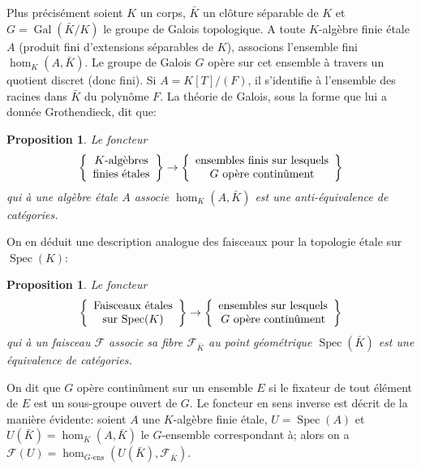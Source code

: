 \documentclass{book}
\DeclareMathOperator{\gal}{Gal}
\DeclareMathOperator{\spec}{Spec}
\newcommand{\cF}{\mathcal{F}}
\newtheorem{proposition}[subsubsection]{Proposition}
\begin{document}
Plus précisément soient $K$ un corps, $\bar K$ un clôture séparable de $K$ et 
$G = \gal(\bar K/K)$ le groupe de Galois topologique. A toute $K$-algèbre finie 
étale $A$ (produit fini d'extensions séparables de $K$), associons l'ensemble 
fini $\hom_K(A,\bar K)$. Le groupe de Galois $G$ opère sur cet ensemble à 
travers un quotient discret (donc fini). Si $A=K[T]/(F)$, il s'identifie à 
l'ensemble des racines dans $\bar K$ du polynôme $F$. La théorie de Galois, 
sous la forme que lui a donnée Grothendieck, dit que:





\begin{proposition}\label{I:2-4-3}
Le foncteur 
\[
  \left\{\begin{array}{c}
          \textnormal{$K$-algèbres} \\ 
          \textnormal{finies étales}
        \end{array}\right\}
  \to 
  \left\{\begin{array}{c}
          \textnormal{ensembles finis sur lesquels} \\
          \textnormal{$G$ opère continûment}
        \end{array}\right\}
\]
qui à une algèbre étale $A$ associe $\hom_K(A,\bar K)$ est une 
anti-équivalence de catégories.
\end{proposition}

On en déduit une description analogue des faisceaux pour la topologie étale sur 
$\spec(K)$:





\begin{proposition}\label{I:2-4-4}
Le foncteur 
\[
  \left\{\begin{array}{c}
          \textnormal{Faisceaux étales} \\ 
          \textnormal{sur $\spec(K)$}
        \end{array}\right\}
  \to 
  \left\{\begin{array}{c}
          \textnormal{ensembles sur lesquels} \\
          \textnormal{$G$ opère continûment}
        \end{array}\right\}
\]
qui à un 
faisceau $\cF$ associe sa fibre $\cF_{\bar K}$ au point géométrique 
$\spec(\bar K)$ est une équivalence de catégories.
\end{proposition}

On dit que $G$ opère continûment sur un ensemble $E$ si le fixateur de tout 
élément de $E$ est un sous-groupe ouvert de $G$. Le foncteur en sens 
inverse est décrit de la manière évidente: soient $A$ une 
$K$-algèbre finie étale, $U=\spec(A)$ et $U(\bar K)=\hom_K(A,\bar K)$ le 
$G$-ensemble correspondant à; alors on a 
$\cF(U)= \hom_{G\text{-ens}}(U(\bar K),\cF_{\bar K})$. 
\end{document}
